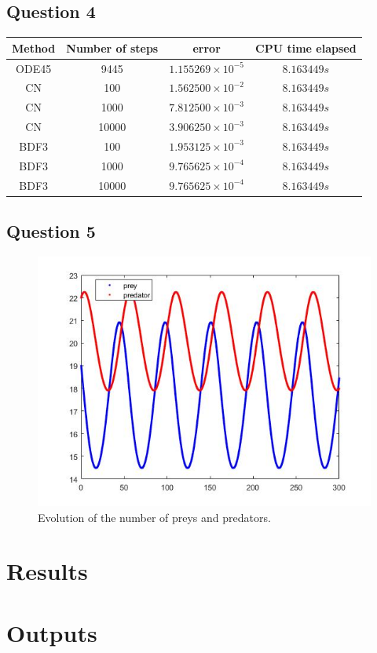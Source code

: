 \documentclass[a4paper, 11pt]{article}
\begin{document}
	\subsection*{Question 4}
	
	\begin{table}[H]
		\centering
		\begin{tabular}{c|c|c|c}
			\textbf{Method} & \textbf{Number of steps} & \textbf{error}  & \textbf{CPU time elapsed}  \\ \hline
			ODE45 	& 9445 	& $ 1.155269\times 10^{-5} $ 	& $ 8.163449 s $ 	\\ \hline %
			CN 		& 100 	& $ 1.562500\times 10^{-2} $ 	& $ 8.163449 s $ 	\\ \hline
			CN 		& 1000 	& $ 7.812500\times 10^{-3} $ 	& $ 8.163449 s $ 	\\ \hline
			CN 		& 10000 & $ 3.906250\times 10^{-3} $ 	& $ 8.163449 s $	\\ \hline
			BDF3 	& 100 	& $ 1.953125\times 10^{-3} $ 	& $ 8.163449 s $ 	\\ \hline
			BDF3 	& 1000	& $ 9.765625\times 10^{-4} $ 	& $ 8.163449 s $ 	\\ \hline
			BDF3 	& 10000 & $ 9.765625\times 10^{-4} $ 	& $ 8.163449 s $ 	\\ \hline
		\end{tabular}
	\end{table}
	
	\subsection*{Question 5}
	\begin{figure}[H]
		\centering
		\includegraphics[width=\linewidth]{ex5.jpg}
		\caption{Evolution of the number of preys and predators.}
		\label{fig:ex5}
	\end{figure}
	
	
	
	
	
	\section*{Results}
	
	
	\section*{Outputs}
	
	
	
\end{document}
